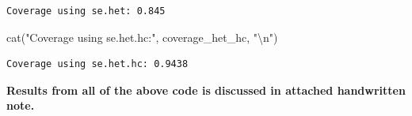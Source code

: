 \documentclass[
  11pt,
]{article}
\newenvironment{Shaded}{\begin{snugshade}}{\end{snugshade}}
\newcommand{\FunctionTok}[1]{\textcolor[rgb]{0.28,0.35,0.67}{#1}}
\newcommand{\NormalTok}[1]{\textcolor[rgb]{0.00,0.23,0.31}{#1}}
\newcommand{\SpecialCharTok}[1]{\textcolor[rgb]{0.37,0.37,0.37}{#1}}
\newcommand{\StringTok}[1]{\textcolor[rgb]{0.13,0.47,0.30}{#1}}
\begin{document}
\begin{verbatim}
Coverage using se.het: 0.845 
\end{verbatim}

\begin{Shaded}
\begin{Highlighting}[]
\FunctionTok{cat}\NormalTok{(}\StringTok{"Coverage using se.het.hc:"}\NormalTok{, coverage\_het\_hc, }\StringTok{"}\SpecialCharTok{\textbackslash{}n}\StringTok{"}\NormalTok{)}
\end{Highlighting}
\end{Shaded}

\begin{verbatim}
Coverage using se.het.hc: 0.9438 
\end{verbatim}

\textbf{Results from all of the above code is discussed in attached
handwritten note.}
\end{document}
